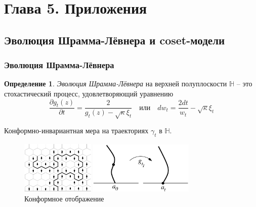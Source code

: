 \documentclass[pdftex]{beamer}
\theoremstyle{definition} \newtheorem{Def}{Определение}
\begin{document}
\section{Глава 5. Приложения}
\label{sec:applications}

\subsection{Эволюция Шрамма-Лёвнера и coset-модели}
\label{sec:SLE}
\begin{frame}
  \frametitle{Эволюция Шрамма-Лёвнера}
  \begin{Def}
    {\it Эволюция Шрамма-Лёвнера} на верхней полуплоскости  $\mathbb{H}$ -- это стохастический процесс, удовлетворяющий уравнению
    \begin{equation*}
      \frac{\partial g_t(z)}{\partial t} = \frac{ 2}{g_t(z)-\sqrt{\kappa}\xi_{t}} \quad \text{или} \quad       d w _{t}= \frac{2dt}{w_{t} }-\sqrt{\kappa}\xi_{t}
    \end{equation*}
  \end{Def}
  Конформно-инвариантная мера на траекториях $\gamma_{t}$ в $\mathbb{H}$.
  \begin{figure}[h]
    \begin{multicols}{2}
      \hfill
      \includegraphics[height=25mm]{figures/explore.pdf}
      \vspace{-0.2cm}
      \caption{Эволюция Шрамма-Лёвнера -- непрерывный предел интерфейсов}
      \label{fig:sle}
      \hfill
      \includegraphics[width=50mm]{figures/loewner.pdf}
      \caption{Конформное отображение}
      \label{fig:sle}
    \end{multicols}

  \end{figure}
\end{frame}
\end{document}
